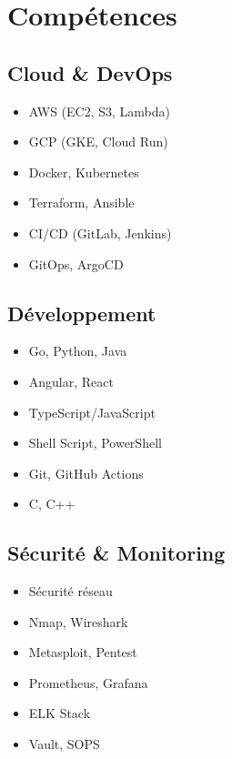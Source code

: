\section{\icon{\faTools} Compétences}
\begin{multicols}{3}
    \subsection*{\textcolor{mainblue}{\faCloud} Cloud \& DevOps}
    \vspace{0.1cm}
    \begin{itemize}
        \item AWS (EC2, S3, Lambda)
        \item GCP (GKE, Cloud Run)
        \item Docker, Kubernetes
        \item Terraform, Ansible
        \item CI/CD (GitLab, Jenkins)
        \item GitOps, ArgoCD
    \end{itemize}

    \columnbreak

    \subsection*{\textcolor{mainblue}{\faCode} Développement}
    \vspace{0.1cm}
    \begin{itemize}
        \item Go, Python, Java
        \item Angular, React
        \item TypeScript/JavaScript
        \item Shell Script, PowerShell
        \item Git, GitHub Actions
        \item C, C++
    \end{itemize}

    \columnbreak

    \subsection*{\textcolor{mainblue}{\faShieldAlt} Sécurité \& Monitoring}
    \vspace{0.1cm}
    \begin{itemize}
        \item Sécurité réseau
        \item Nmap, Wireshark
        \item Metasploit, Pentest
        \item Prometheus, Grafana
        \item ELK Stack
        \item Vault, SOPS
    \end{itemize}
\end{multicols}